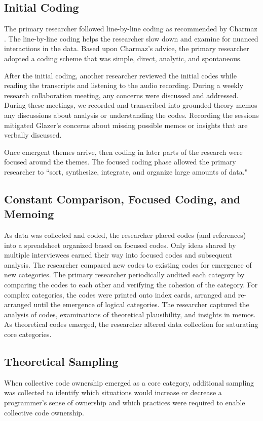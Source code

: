 \subsection{Initial Coding}
The primary researcher followed line-by-line coding as recommended by Charmaz \cite{Charmaz}. The line-by-line coding helps the researcher slow down and examine for nuanced interactions in the data. Based upon Charmaz's advice, the primary researcher adopted a coding scheme that was simple, direct, analytic, and spontaneous.  

After the initial coding, another researcher reviewed the initial codes while reading the transcripts and listening to the audio recording. During a weekly research collaboration meeting, any concerns were discussed and addressed. During these meetings, we recorded and transcribed into grounded theory memos any discussions about analysis or understanding the codes. Recording the sessions mitigated Glazer's concerns about missing possible memos or insights that are verbally discussed. \cite{GlaserTheoreticalSensitivity}

Once emergent themes arrive, then coding in later parts of the research were focused around the themes. The focused coding phase allowed the primary researcher to ``sort, synthesize, integrate, and organize large amounts of data."
\subsection{Constant Comparison, Focused Coding, and Memoing}
As data was collected and coded, the researcher placed codes (and references) into a spreadsheet organized based on focused codes. Only ideas shared by multiple interviewees earned their way into focused codes and subsequent analysis. The researcher compared new codes to existing codes for emergence of new categories. The primary researcher periodically audited each category by comparing the codes to each other and verifying the cohesion of the category. For complex categories, the codes were printed onto index cards, arranged and re-arranged until the emergence of logical categories.  The researcher captured the analysis of codes, examinations of theoretical plausibility, and insights in memos. As theoretical codes emerged, the researcher altered data collection for saturating core categories. 

\subsection{Theoretical Sampling}
When collective code ownership emerged as a core category, additional sampling was collected to identify which situations would increase or decrease a programmer's sense of ownership and which practices were required to enable collective code ownership.

